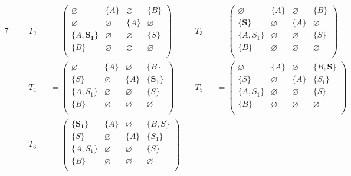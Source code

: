 \begin{example}
\begin{alignat*}{7}
& &&T_2 &&= \begin{pmatrix}
\varnothing & \{A\}       & \varnothing & \{B\}       \\
\varnothing & \varnothing & \{A\}       & \varnothing \\
\{A, \pmb{S_1}\}  & \varnothing & \varnothing & \{S\}       \\
\{B\}       & \varnothing & \varnothing & \varnothing \\
\end{pmatrix} \ \ \ \ &&T_3 &&= \begin{pmatrix}
\varnothing & \{A\}       & \varnothing & \{B\}       \\
\{\pmb{S}\}       & \varnothing & \{A\}       & \varnothing \\
\{A, S_1\}  & \varnothing & \varnothing & \{S\}       \\
\{B\}       & \varnothing & \varnothing & \varnothing \\
\end{pmatrix} \\ & &&T_4 &&= \begin{pmatrix}
\varnothing & \{A\}       & \varnothing & \{B\}       \\
\{S\}       & \varnothing & \{A\}       & \{\pmb{S_1}\}     \\
\{A, S_1\}  & \varnothing & \varnothing & \{S\}       \\
\{B\}       & \varnothing & \varnothing & \varnothing \\
\end{pmatrix}  \ \ \ \ &&T_5 &&= \begin{pmatrix}
\varnothing & \{A\}       & \varnothing & \{B, \pmb{S}\}    \\
\{S\}       & \varnothing & \{A\}       & \{S_1\}     \\
\{A, S_1\}  & \varnothing & \varnothing & \{S\}       \\
\{B\}       & \varnothing & \varnothing & \varnothing \\
\end{pmatrix} \\ & &&T_6 &&= \begin{pmatrix}
\{\pmb{S_1}\}     & \{A\}       & \varnothing & \{B, S\}    \\
\{S\}       & \varnothing & \{A\}       & \{S_1\}     \\
\{A, S_1\}  & \varnothing & \varnothing & \{S\}       \\
\{B\}       & \varnothing & \varnothing & \varnothing \\

\end{pmatrix}
\end{alignat*}
\end{example}
